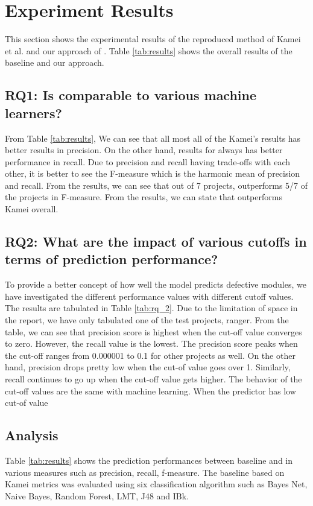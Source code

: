 \section{Experiment Results}
This section shows the experimental results of the reproduced method of Kamei et al. \cite{kamei2012large} and our approach of {\simfinmo}.
Table \ref{tab:results} shows the overall results of the baseline and our approach.

\subsection{RQ1: Is {\simfinmo} comparable to various machine learners?}
From Table \ref{tab:results},
We can see that all most all of the Kamei's results has better results in precision.
On the other hand, results for {\simfinmo} always has better performance in recall.
Due to precision and recall having trade-offs with each other, it is better to see the F-measure which is the harmonic mean of precision and recall.
From the results, we can see that out of 7 projects, {\simfinmo} outperforms 5/7 of the projects in F-measure.
From the results, we can state that {\simfinmo} outperforms Kamei overall.

\subsection{RQ2: What are the impact of various {\simfinmo} cutoffs in terms of prediction performance?}
To provide a better concept of how well the model {\simfinmo} predicts defective modules, we have investigated the different performance values with different cutoff values.
The results are tabulated in Table \ref{tab:rq_2}.
Due to the limitation of space in the report, we have only tabulated one of the test projects, ranger.
From the table, we can see that precision score is highest when the cut-off value converges to zero.
However, the recall value is the lowest.
The precision score peaks when the cut-off ranges from 0.000001 to 0.1 for other projects as well.
On the other hand, precision drops pretty low when the cut-of value goes over 1.
Similarly, recall continues to go up when the cut-off value gets higher.
The behavior of the cut-off values are the same with machine learning.
When the predictor has low cut-of value 

\subsection{Analysis}
Table \ref{tab:results} shows the prediction performances between baseline and {\simfinmo} in various measures such as precision, recall, f-measure. The baseline based on Kamei metrics was evaluated using six classification algorithm such as Bayes Net, Naive Bayes, Random Forest, LMT, J48 and IBk. 

